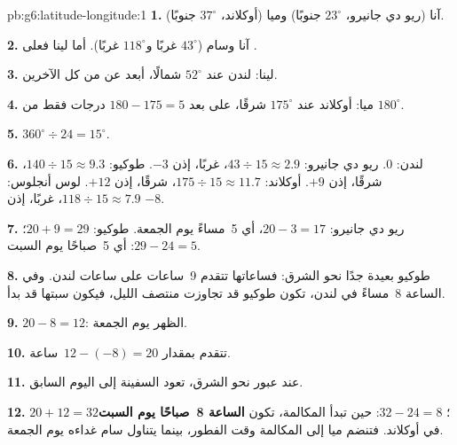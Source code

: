 \begin{solution}{pb:g6:latitude-longitude:1}
\textbf{1.} آنا (ريو دي جانيرو، $23^\circ$ جنوبًا) وميا (أوكلاند،
$37^\circ$ جنوبًا).

\textbf{2.} آنا وسام ($43^\circ$ غربًا و$118^\circ$ غربًا). أما لينا فعلى
.

\textbf{3.} لينا: لندن عند $52^\circ$ شمالًا، أبعد عن 
من كل الآخرين.

\textbf{4.} ميا: أوكلاند عند $175^\circ$ شرقًا، على بعد $180 - 175 = 5$
درجات فقط من  $180^\circ$.

\textbf{5.} $360^\circ \div 24 = 15^\circ$.

\textbf{6.} لندن: $0$. ريو دي جانيرو: $43 \div 15 \approx 2.9$، غربًا،
إذن $-3$. طوكيو: $140 \div 15 \approx 9.3$، شرقًا، إذن $+9$. أوكلاند:
$175 \div 15 \approx 11.7$، شرقًا، إذن $+12$. لوس أنجلوس:
$118 \div 15 \approx 7.9$، غربًا، إذن $-8$.

\textbf{7.} ريو دي جانيرو: $20 - 3 = 17$، أي 5~مساءً يوم الجمعة. طوكيو:
$20 + 9 = 29$؛ $29 - 24 = 5$: أي 5~صباحًا يوم السبت.

\textbf{8.} طوكيو بعيدة جدًا نحو الشرق: فساعاتها تتقدم 9~ساعات على ساعات
لندن. وفي الساعة 8~مساءً في لندن، تكون طوكيو قد تجاوزت منتصف الليل، فيكون
سبتها قد بدأ.

\textbf{9.} $20 - 8 = 12$: الظهر يوم الجمعة.

\textbf{10.} تتقدم بمقدار $12 - (-8) = 20$~ساعة.

\textbf{11.} عند عبور  نحو الشرق، تعود السفينة إلى
اليوم السابق.

\textbf{12.} $20 + 12 = 32$؛ $32 - 24 = 8$: حين تبدأ المكالمة، تكون
\textbf{الساعة 8~صباحًا يوم السبت} في أوكلاند. فتنضم ميا إلى المكالمة وقت
الفطور، بينما يتناول سام غداءه يوم الجمعة.
\end{solution}
